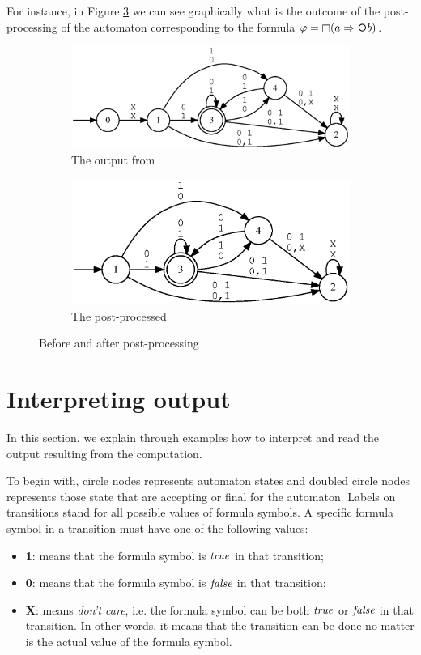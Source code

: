 For instance, in Figure \ref{fig:pre-post-automaton} we can see graphically what is the outcome of the post-processing of the automaton corresponding to the formula $\varphi = \Always (a \Rightarrow \Next b)$.
\begin{figure}[h]
\centering
\begin{subfigure}{.5\textwidth}
  \centering
  \includegraphics[width=\linewidth]{images/pre-automaton.eps}
  \caption{The \DFA output from \MONA}
  \label{fig:mona-output}
\end{subfigure}%
\begin{subfigure}{.5\textwidth}
  \centering
  \includegraphics[width=\linewidth]{images/post-automaton.eps}
  \caption{The \DFA post-processed}
  \label{fig:automa-post-processed}
\end{subfigure}
\caption{Before and after \DFA post-processing}
\label{fig:pre-post-automaton}
\end{figure}
\section{Interpreting \LTLfToDFA output}
In this section, we explain through examples how to interpret and read the output \DFA resulting from the \LTLfToDFA computation.

To begin with, circle nodes represents automaton states and doubled circle nodes represents those state that are accepting or final for the automaton. Labels on transitions stand for all possible values of formula symbols. A specific formula symbol in a transition must have one of the following values:
\begin{itemize}
\item \textbf{1}: means that the formula symbol is $\mathit{true}$ in that transition;
\item \textbf{0}: means that the formula symbol is $\mathit{false}$ in that transition;
\item \textbf{X}: means \textit{don't care}, i.e. the formula symbol can be both $\mathit{true}$ or $\mathit{false}$ in that transition. In other words, it means that the transition can be done no matter is the actual value of the formula symbol.
\end{itemize}

